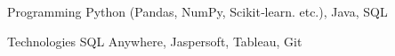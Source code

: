

% 
%

\begin{cvskills}

  \cvskill
    {Programming} %
    {Python (Pandas, NumPy, Scikit‑learn. etc.), Java, SQL} %

  \cvskill
    {Technologies} %
    {SQL Anywhere, Jaspersoft, Tableau, Git} %
    


\end{cvskills}
